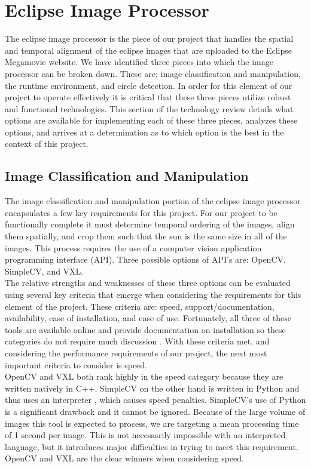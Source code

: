\documentclass[10pt, onecolumn, draftclsnofoot, letterpaper, compsoc]{IEEEtran}
\begin{document}
\section{Eclipse Image Processor}

The eclipse image processor is the piece of our project that handles the spatial
and temporal alignment of the eclipse images that are uploaded to the Eclipse
Megamovie website. We have identified three pieces into which
the image processor can be broken down. These are: image classification and
manipulation, the runtime environment, and circle detection. In order for this
element of our project to operate effectively it is critical that these three
pieces utilize robust and functional technologies. This section of the
technology review details what options are available for implementing each of
these three pieces, analyzes these options, and arrives at a determination as to
which option is the best in the context of this project.\\

\subsection{Image Classification and Manipulation}

The image classification and manipulation portion of the eclipse image processor
encapsulates a few key requirements for this project. For our project to be
functionally complete it must determine temporal ordering of the images, align
them spatially, and crop them such that the sun is the same size in all of the
images. This process requires the use of a computer vision application
programming interface (API). Three possible options of API's are: OpenCV,
SimpleCV, and VXL. \\

The relative strengths and weaknesses of these three options can be evaluated
using several key criteria that emerge when considering the requirements for
this element of the project. These criteria are: speed, support/documentation,
availability, ease of installation, and ease of use. Fortunately, all three of
these tools are available online and provide documentation on installation so
these categories do not require much discussion \cite{OCV, VXL, SCV}. With these
criteria met, and considering the performance requirements of our project, the
next most important criteria to consider is speed. \\

OpenCV and VXL both rank highly in the speed category because they are written
natively in C++\cite{OCV, VXL}. SimpleCV on the other hand is written in Python
and thus uses an interpreter \cite{SCV}, which causes speed penalties.
SimpleCV’s use of Python is a significant drawback and it cannot be ignored.
Because of the large volume of images this tool is expected to process, we are
targeting a mean processing time of 1 second per image. This is not necessarily
impossible with an interpreted language, but it introduces major difficulties in
trying to meet this requirement. OpenCV and VXL are the clear winners when
considering speed. \\
\end{document}
